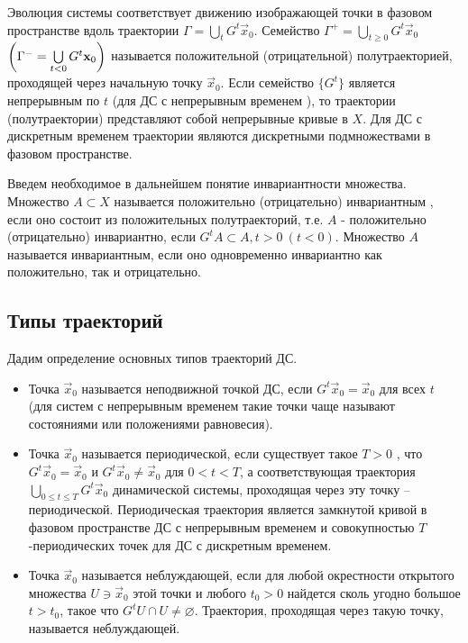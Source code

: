  Эволюция системы соответствует движению изображающей точки в фазовом пространстве вдоль траектории $\Gamma = \bigcup\limits_t G^t \vec x_0$. Семейство $ \Gamma^+ = \bigcup\limits_{t\geq 0} G^t \vec x_0 $\quad  $ \qty(\Gamma^- = \bigcup\limits_{t< 0} G^t \mathbf x_0)$ называется положительной (отрицательной) полутраекторией, проходящей через начальную точку $\vec x_0$. Если семейство $\{G^t\}$ является непрерывным по $t$ (для ДС с непрерывным временем ), то траектории (полутраектории) представляют собой непрерывные кривые в $X$. Для ДС с дискретным временем траектории являются дискретными подмножествами в фазовом пространстве.

 Введем необходимое в дальнейшем понятие инвариантности множества.
 Множество $A \subset X$ называется положительно (отрицательно) инвариантным , если оно состоит из положительных полутраекторий, т.е. $A$ - положительно (отрицательно) инвариантно, если $G^t A \subset A, t>0 ~ (t<0)$. Множество $A$ называется инвариантным, если оно одновременно инвариантно как положительно, так и отрицательно.	


\subsection{Типы траекторий} %
\label{subsubsec:1.2.1}
Дадим определение основных типов траекторий ДС.
\begin{itemize}
	\item Точка $\vec x_0$ называется неподвижной точкой ДС, если $G^t \vec x_0 = \vec x_0$ для всех $t$ (для систем с непрерывным временем такие точки чаще называют состояниями или положениями равновесия).
	\item Точка $\vec x_0$ называется периодической, если существует такое $T>0$ , что $G^t \vec x_0 = \vec x_0$ и $G^t \vec x_0 \neq \vec x_0$ для $0<t<T$, а соответствующая траектория $\bigcup\limits_{0\leq t \leq T} G^t \vec x_0$ динамической системы, проходящая через эту точку -- периодической. Периодическая траектория является замкнутой кривой в фазовом пространстве ДС с непрерывным временем и совокупностью $T$-периодических точек для ДС с дискретным временем.
	\item Точка $\vec x_0$ называется неблуждающей, если для любой окрестности открытого множества $U \ni \vec x_0$ этой точки и любого $t_0>0$ найдется сколь угодно большое $t>t_0$, такое что $G^t U \cap U \neq \varnothing $. Траектория, проходящая через такую точку, называется неблуждающей. 
\end{itemize}


